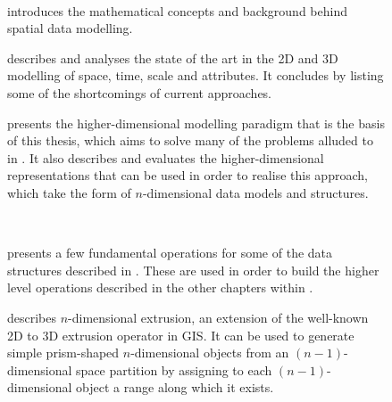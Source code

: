 \begin{description}

\item[ ] \ 

\begin{description}

\item[]
introduces the mathematical concepts and background behind spatial data modelling.

\item[]
describes and analyses the state of the art in the 2D and 3D modelling of space, time, scale and attributes.
It concludes by listing some of the shortcomings of current approaches.

\item[]
presents the higher-dimensional modelling paradigm that is the basis of this thesis, which aims to solve many of the problems alluded to in .
It also describes and evaluates the higher-dimensional representations that can be used in order to realise this approach, which take the form of $n$-dimensional data models and structures.

\end{description}

\clearpage
\item[ ] \ 

\begin{description}

\item[]
presents a few fundamental operations for some of the data structures described in .
These are used in order to build the higher level operations described in the other chapters within .

\item[]
describes $n$-dimensional extrusion, an extension of the well-known 2D to 3D extrusion operator in GIS.\@
It can be used to generate simple prism-shaped $n$-dimensional objects from an $(n-1)$-dimensional space partition by assigning to each $(n-1)$-dimensional object a range along which it exists.


\end{description}
\end{description}
